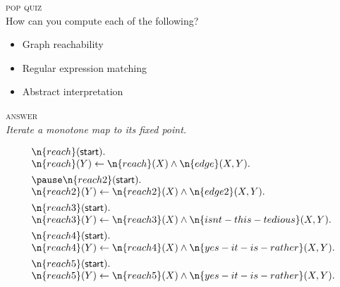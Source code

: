 \documentclass[aspectratio=169,dvipsnames]{beamer}
\date{}
\renewcommand\c\textsf
\begin{document}
  \Large


  

  \begin{frame}
    \textsc{pop quiz}\\ How can you compute each of the following?
    \vspace{1ex}
    \begin{itemize}
    \item Graph reachability
    \item Regular expression matching
    \item Abstract interpretation
    \end{itemize}

    \pause\vspace{1ex}

    \textsc{answer}\\ \itshape Iterate a monotone map to its fixed point.

    \vspace{\baselineskip}

  \end{frame}


  \begin{frame}
    \begin{fleqn}[1em]
    \begin{minipage}[t][.38\paperheight]{\paperwidth}
      \[\begin{array}{l}
      \n{reach}(\c{start}).\\
      \n{reach}(Y) \gets \n{reach}(X) \wedge \n{edge}(X,Y).\\[1ex]\pause
      \n{reach2}(\c{start}).\\
      \n{reach2}(Y) \gets \n{reach2}(X) \wedge \n{edge2}(X,Y).\\[1ex]
      \n{reach3}(\c{start}).\\
      \n{reach3}(Y) \gets \n{reach3}(X) \wedge \n{isnt-this-tedious}(X,Y).
      \\[1ex]
      \n{reach4}(\c{start}).\\
      \n{reach4}(Y) \gets \n{reach4}(X) \wedge \n{yes-it-is-rather}(X,Y).
      \\[1ex]
      \n{reach5}(\c{start}).\\
      \n{reach5}(Y) \gets \n{reach5}(X) \wedge \n{yes-it-is-rather}(X,Y).\\
      \end{array}\]
    \end{minipage}
    \end{fleqn}
  \end{frame}
\end{document}
